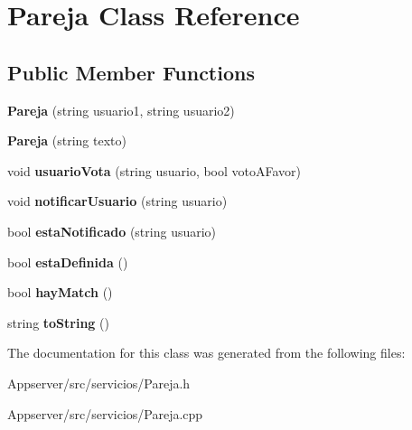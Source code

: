 \hypertarget{classPareja}{}\section{Pareja Class Reference}
\label{classPareja}
\subsection*{Public Member Functions}
\begin{DoxyCompactItemize}
\item 
{\bfseries Pareja} (string usuario1, string usuario2)\hypertarget{classPareja_a4e91ba500129e03a22ca5146d03bd7da}{}\label{classPareja_a4e91ba500129e03a22ca5146d03bd7da}

\item 
{\bfseries Pareja} (string texto)\hypertarget{classPareja_a237161a5d6ce6c3068e4005f33c1ee94}{}\label{classPareja_a237161a5d6ce6c3068e4005f33c1ee94}

\item 
void {\bfseries usuario\+Vota} (string usuario, bool voto\+A\+Favor)\hypertarget{classPareja_a9faf806fe2495b4136e14b6b0880c590}{}\label{classPareja_a9faf806fe2495b4136e14b6b0880c590}

\item 
void {\bfseries notificar\+Usuario} (string usuario)\hypertarget{classPareja_a33774363ab6d6a494b0a6ae0aeafc55a}{}\label{classPareja_a33774363ab6d6a494b0a6ae0aeafc55a}

\item 
bool {\bfseries esta\+Notificado} (string usuario)\hypertarget{classPareja_a008252b44151f929af766c2f896eb6b6}{}\label{classPareja_a008252b44151f929af766c2f896eb6b6}

\item 
bool {\bfseries esta\+Definida} ()\hypertarget{classPareja_a8de1cfa63b2c6e9ee7cacf06945b5e74}{}\label{classPareja_a8de1cfa63b2c6e9ee7cacf06945b5e74}

\item 
bool {\bfseries hay\+Match} ()\hypertarget{classPareja_a1047f97768abe63fdd98e523b859c3a8}{}\label{classPareja_a1047f97768abe63fdd98e523b859c3a8}

\item 
string {\bfseries to\+String} ()\hypertarget{classPareja_a011462c96fb97f4376196b073d141703}{}\label{classPareja_a011462c96fb97f4376196b073d141703}

\end{DoxyCompactItemize}


The documentation for this class was generated from the following files\+:\begin{DoxyCompactItemize}
\item 
Appserver/src/servicios/Pareja.\+h\item 
Appserver/src/servicios/Pareja.\+cpp\end{DoxyCompactItemize}
